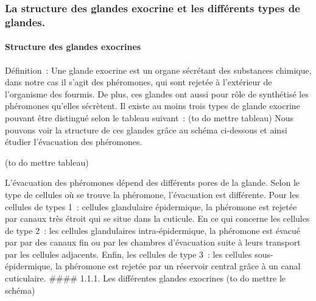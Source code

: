 \subsubsection{La structure des glandes exocrine et les différents types de glandes.}
\paragraph{ Structure des glandes exocrines}

Définition~: Une glande exocrine est un organe sécrétant des substances
chimique, dans notre cas il s'agit des phéromones, qui sont rejetée à
l'extérieur de l'organisme des fourmis. De plus, ces glandes ont aussi
pour rôle de synthétisé les phéromones qu'elles sécrètent. Il existe au
moins trois types de glande exocrine pouvant être distingué selon le
tableau suivant~: (to do mettre tableau) Nous pouvons voir la structure
de ces glandes grâce au schéma ci-dessous et ainsi étudier l'évacuation
des phéromones.

(to do mettre tableau)

L'évacuation des phéromones dépend des différents pores de la glande.
Selon le type de cellules où se trouve la phéromone, l'évacuation est
différente. Pour les cellules de types 1~: cellules glandulaire
épidermique, la phéromone est rejetée par canaux très étroit qui se
situe dans la cuticule. En ce qui concerne les cellules de type 2~: les
cellules glandulaires intra-épidermique, la phéromone est évacué par par
des canaux fin ou par les chambres d'évacuation suite à leurs transport
par les cellules adjacents. Enfin, les cellules de type 3~: les cellules
sous-épidermique, la phéromone est rejetée par un réservoir central
grâce à un canal cuticulaire. \#\#\#\# 1.1.1. Les différentes glandes
exocrines (to do mettre le schéma)

